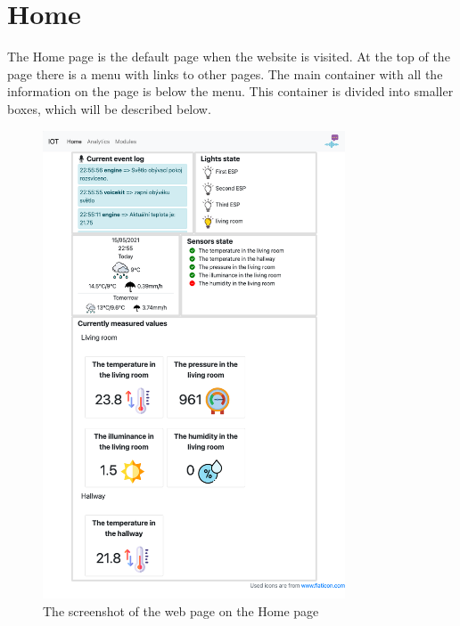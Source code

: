 


\section{Home}

The Home page is the default page when the website is visited. At the top of the page there is a menu with links to other pages. The main container with all the information on the page is below the menu. This container is divided into smaller boxes, which will be described below.

\begin{figure}[H]
    \centering
    \includegraphics[width=0.8\textwidth]{img/web_home.png}
    \caption{The screenshot of the web page on the Home page}
    \label{fig:web_home}
\end{figure}

